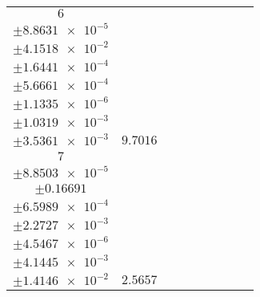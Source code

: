 \documentclass[8pt]{article}
\begin{document}
\begin{longtable}[l]{c c c c c c c c c}
$\num{6}$ & \begin{tabular}[c]{@{}c@{}}$\num{0.12284}$ \\ $\pm\num{8.8631e-5}$\end{tabular} & \begin{tabular}[c]{@{}c@{}}$\num{0.33701}$ \\ $\pm\num{4.1518e-2}$\end{tabular} & \begin{tabular}[c]{@{}c@{}}$\num{7.3994}$ \\ $\pm\num{1.6441e-4}$\end{tabular} & \begin{tabular}[c]{@{}c@{}}$\num{1.3795e+3}$ \\ $\pm\num{5.6661e-4}$\end{tabular} & \begin{tabular}[c]{@{}c@{}}$\num{2.7598}$ \\ $\pm\num{1.1335e-6}$\end{tabular} & \begin{tabular}[c]{@{}c@{}}$\num{1.178}$ \\ $\pm\num{1.0319e-3}$\end{tabular} & \begin{tabular}[c]{@{}c@{}}$\num{4.2374}$ \\ $\pm\num{3.5361e-3}$\end{tabular} & $\num{9.7016}$\\
$\num{7}$ & \begin{tabular}[c]{@{}c@{}}$\num{3.0516e-2}$ \\ $\pm\num{8.8503e-5}$\end{tabular} & \begin{tabular}[c]{@{}c@{}}$\num{2.4834e-2}$ \\ $\pm\num{0.16691}$\end{tabular} & \begin{tabular}[c]{@{}c@{}}$\num{-15.889}$ \\ $\pm\num{6.5989e-4}$\end{tabular} & \begin{tabular}[c]{@{}c@{}}$\num{1.4226e+3}$ \\ $\pm\num{2.2727e-3}$\end{tabular} & \begin{tabular}[c]{@{}c@{}}$\num{2.8459}$ \\ $\pm\num{4.5467e-6}$\end{tabular} & \begin{tabular}[c]{@{}c@{}}$\num{1.1768}$ \\ $\pm\num{4.1445e-3}$\end{tabular} & \begin{tabular}[c]{@{}c@{}}$\num{4.2251}$ \\ $\pm\num{1.4146e-2}$\end{tabular} & $\num{2.5657}$\\

\end{longtable}
\end{document}
